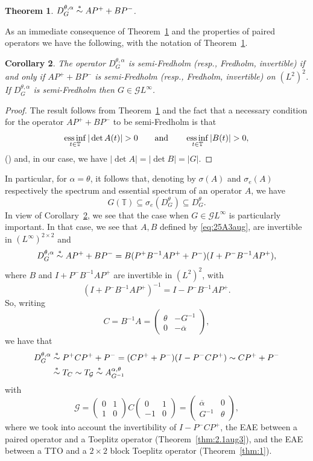 \documentclass[11pt]{article}
\newtheorem{thm}{Theorem}[section]
\newtheorem{cor}[thm]{Corollary}
\def\G{\mathcal G}
\def\TT{\mathbb T}
\def\beginpf{\begin{proof}}
\def\endpf{\end{proof}}
\def\ol{\overline}
\newcommand{\simast}{%
    \ensuremath{%
       \stackrel{\mathsf{\ast}}{\sim}}}
\def\essinf{\mathop{\rm ess \, inf}}
\begin{document}
\begin{thm} 
\label{thm:4.1aug3}
\cite{CKLP}
$ D_G^{\theta,\alpha} \simast AP^++BP^-$.
\end{thm}


As an immediate consequence of Theorem~\ref{thm:4.1aug3} and the properties of paired operators we have the following, with the notation of Theorem~\ref{thm:4.1aug3}.

\begin{cor}\label{cor:4.1A3aug}
The operator $D^{\theta,\alpha}_G$ is semi-Fredholm (resp., Fredholm, invertible)
if and only if $AP^+ + BP^-$ is semi-Fredholm (resp., Fredholm, invertible)
on $(L^2)^2$. If $D_G^{\theta,\alpha}$ is semi-Fredholm then $G \in \G L^\infty$.
\end{cor}
\beginpf
The result follows from Theorem~\ref{thm:4.1aug3} and the fact that a 
necessary condition for the operator $AP^+ + BP^-$ to be semi-Fredholm
is that 
\[
\essinf_{t \in \TT} |\det A(t)|>0 \qquad \hbox{and} \qquad \essinf_{t \in \TT} |B(t)|>0,
\]
(\cite[Chap. 5]{MP})
and, in our case, we have $|\det A|=|\det B|=|G|$.
\endpf

In particular, for $\alpha=\theta$, it follows that, denoting by $\sigma(A)$ and $\sigma_e(A)$
respectively  the 
spectrum and essential spectrum of an operator $A$, we have
\[
G(\TT) \subseteq \sigma_e(D^\theta_G) \subseteq D^\theta_G.
\]
In view of Corollary~\ref{cor:4.1A3aug}, we see that the case when $G \in \G L^\infty$
is particularly important. In that case, we see that $A,B$ defined by \eqref{eq:25A3aug},
are invertible in $(L^\infty)^{2 \times 2}$ and
\[
D_G^{\theta,\alpha} \simast AP^+ + BP^- = B(P^+B^{-1}AP^++P^-)(I+P^{-}B^{-1}AP^+),
\]
where $B$ and $I+P^-B^{-1}AP^+$ are invertible in $(L^2)^2$, with
\[
(I+P^-B^{-1}AP^+)^{-1}=I-P^-B^{-1}AP^+.
\]
 So, writing
 \[
 C=B^{-1}A = \begin{pmatrix} \theta & -G^{-1} \\ 0 & -\ol\alpha \end{pmatrix},
 \]
 we have that 
 \begin{align*}
 D_G^{\theta,\alpha} & \simast P^+CP^++P^- = (CP^++P^-)(I-P^-CP^+) \sim  CP^+ +P^- \\
 & \simast T_C \sim T_\G \simast A^{\alpha,\theta}_{G^{-1}}
 \end{align*}
 with
 \[
 \G= \begin{pmatrix} 0 & 1 \\  1 & 0 \end{pmatrix}
 C \begin{pmatrix} 0 & 1 \\ -1 & 0 \end{pmatrix}
 = \begin{pmatrix} \ol\alpha & 0 \\ G^{-1} & \theta \end{pmatrix},
 \]
 where we took into account the invertibility of $I-P^-CP^+$, the EAE between a paired operator and a Toeplitz operator (Theorem~\ref{thm:2.1aug3}), and the EAE between a TTO and a $2 \times 2$
 block Toeplitz operator (Theorem~\ref{thm:1}).
 
\end{document}

